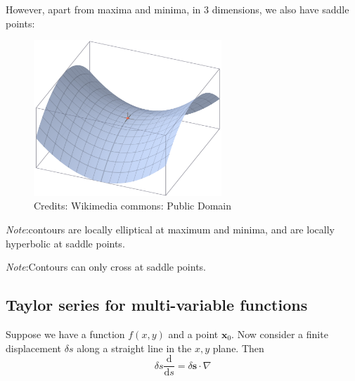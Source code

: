 \documentclass[a4paper]{article}
\theoremstyle{definition}
\newcommand{\mb}[1]{\mathbf{#1}}
\newcommand{\note}{\noindent \emph{Note}:\;}
\renewcommand{\d}{\mathrm{d}}
\begin{document}
However, apart from maxima and minima, in 3 dimensions, we also have saddle points:

\begin{figure}[ht]
  \centering
  \includegraphics[width=200pt]{images/de_22.png}
  \caption*{Credits: Wikimedia commons: Public Domain}
\end{figure}

\note contours are locally elliptical at maximum and minima, and are locally hyperbolic at saddle points.

\note Contours can only cross at saddle points.
\subsection{Taylor series for multi-variable functions}
Suppose we have a function $f(x, y)$ and a point $\mb{x}_0$. Now consider a finite displacement $\delta s$ along a straight line in the $x,y$ plane. Then
\[
\delta s\frac{\d }{\d s} = \delta \mb{s}\cdot \nabla
\]
\end{document}
